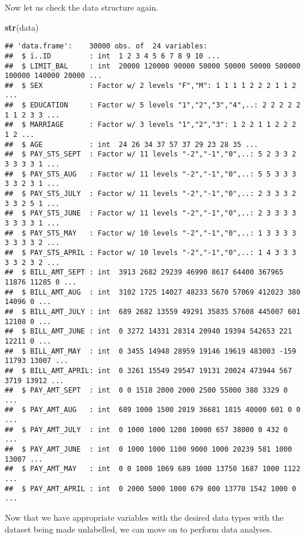 \documentclass[]{article}
\newenvironment{Shaded}{\begin{snugshade}}{\end{snugshade}}
\newcommand{\KeywordTok}[1]{\textcolor[rgb]{0.13,0.29,0.53}{\textbf{#1}}}
\newcommand{\NormalTok}[1]{#1}
\begin{document}
Now let us check the data structure again.

\begin{Shaded}
\begin{Highlighting}[]
\KeywordTok{str}\NormalTok{(data)}
\end{Highlighting}
\end{Shaded}

\begin{verbatim}
## 'data.frame':    30000 obs. of  24 variables:
##  $ ï..ID         : int  1 2 3 4 5 6 7 8 9 10 ...
##  $ LIMIT_BAL     : int  20000 120000 90000 50000 50000 50000 500000 100000 140000 20000 ...
##  $ SEX           : Factor w/ 2 levels "F","M": 1 1 1 1 2 2 2 1 1 2 ...
##  $ EDUCATION     : Factor w/ 5 levels "1","2","3","4",..: 2 2 2 2 2 1 1 2 3 3 ...
##  $ MARRIAGE      : Factor w/ 3 levels "1","2","3": 1 2 2 1 1 2 2 2 1 2 ...
##  $ AGE           : int  24 26 34 37 57 37 29 23 28 35 ...
##  $ PAY_STS_SEPT  : Factor w/ 11 levels "-2","-1","0",..: 5 2 3 3 2 3 3 3 3 1 ...
##  $ PAY_STS_AUG   : Factor w/ 11 levels "-2","-1","0",..: 5 5 3 3 3 3 3 2 3 1 ...
##  $ PAY_STS_JULY  : Factor w/ 11 levels "-2","-1","0",..: 2 3 3 3 2 3 3 2 5 1 ...
##  $ PAY_STS_JUNE  : Factor w/ 11 levels "-2","-1","0",..: 2 3 3 3 3 3 3 3 3 1 ...
##  $ PAY_STS_MAY   : Factor w/ 10 levels "-2","-1","0",..: 1 3 3 3 3 3 3 3 3 2 ...
##  $ PAY_STS_APRIL : Factor w/ 10 levels "-2","-1","0",..: 1 4 3 3 3 3 3 2 3 2 ...
##  $ BILL_AMT_SEPT : int  3913 2682 29239 46990 8617 64400 367965 11876 11285 0 ...
##  $ BILL_AMT_AUG  : int  3102 1725 14027 48233 5670 57069 412023 380 14096 0 ...
##  $ BILL_AMT_JULY : int  689 2682 13559 49291 35835 57608 445007 601 12108 0 ...
##  $ BILL_AMT_JUNE : int  0 3272 14331 28314 20940 19394 542653 221 12211 0 ...
##  $ BILL_AMT_MAY  : int  0 3455 14948 28959 19146 19619 483003 -159 11793 13007 ...
##  $ BILL_AMT_APRIL: int  0 3261 15549 29547 19131 20024 473944 567 3719 13912 ...
##  $ PAY_AMT_SEPT  : int  0 0 1518 2000 2000 2500 55000 380 3329 0 ...
##  $ PAY_AMT_AUG   : int  689 1000 1500 2019 36681 1815 40000 601 0 0 ...
##  $ PAY_AMT_JULY  : int  0 1000 1000 1200 10000 657 38000 0 432 0 ...
##  $ PAY_AMT_JUNE  : int  0 1000 1000 1100 9000 1000 20239 581 1000 13007 ...
##  $ PAY_AMT_MAY   : int  0 0 1000 1069 689 1000 13750 1687 1000 1122 ...
##  $ PAY_AMT_APRIL : int  0 2000 5000 1000 679 800 13770 1542 1000 0 ...
\end{verbatim}

Now that we have appropriate variables with the desired data types with
the dataset being made unlabelled, we can move on to perform data
analyses.
\end{document}

